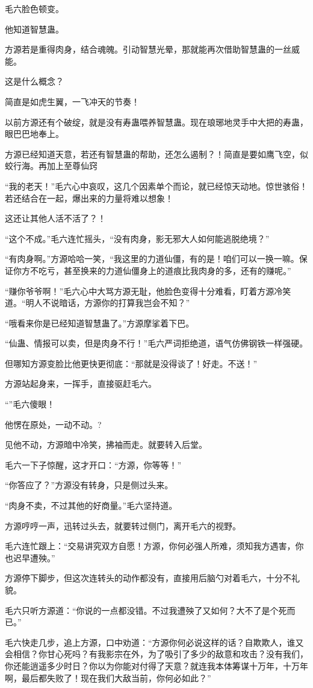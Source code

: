 \begin{this_body}
毛六脸色顿变。

他知道智慧蛊。

方源若是重得肉身，结合魂魄。引动智慧光晕，那就能再次借助智慧蛊的一丝威能。

这是什么概念？

简直是如虎生翼，一飞冲天的节奏！

以前方源还有个破绽，就是没有寿蛊喂养智慧蛊。现在琅琊地灵手中大把的寿蛊，眼巴巴地奉上。

方源已经知道天意，若还有智慧蛊的帮助，还怎么遏制？！简直是要如鹰飞空，似蛟行海。再加上至尊仙窍

“我的老天！”毛六心中哀叹，这几个因素单个而论，就已经惊天动地。惊世骇俗！若还结合在一起，爆出来的力量将难以想象！

这还让其他人活不活了？！

“这个不成。”毛六连忙摇头，“没有肉身，影无邪大人如何能逃脱绝境？”

“有肉身啊。”方源哈哈一笑，“我这里的力道仙僵，有的是！咱们可以一换一嘛。保证你方不吃亏，甚至换来的力道仙僵身上的道痕比我肉身的多，还有的赚呢。”

“赚你爷爷啊！”毛六心中大骂方源无耻，他脸色变得十分难看，盯着方源冷笑道。“明人不说暗话，方源你的打算我岂会不知？”

“哦看来你是已经知道智慧蛊了。”方源摩挲着下巴。

“仙蛊、情报可以卖，但是肉身不行！”毛六严词拒绝道，语气仿佛钢铁一样强硬。

但哪知方源变脸比他更快更彻底：“那就是没得谈了！好走。不送！”

方源站起身来，一挥手，直接驱赶毛六。

“”毛六傻眼！

他愣在原处，一动不动。?

见他不动，方源暗中冷笑，拂袖而走。就要转入后堂。

毛六一下子惊醒，这才开口：“方源，你等等！”

“你答应了？”方源没有转身，只是侧过头来。

“肉身不卖，不过其他的好商量。”毛六坚持道。

方源哼哼一声，迅转过头去，就要转过侧门，离开毛六的视野。

毛六连忙跟上：“交易讲究双方自愿！方源，你何必强人所难，须知我方遇害，你也迟早遭殃。”

方源停下脚步，但这次连转头的动作都没有，直接用后脑勺对着毛六，十分不礼貌。

毛六只听方源道：“你说的一点都没错。不过我遭殃了又如何？大不了是个死而已。”

毛六快走几步，追上方源，口中劝道：“方源你何必说这样的话？自欺欺人，谁又会相信？你甘心死吗？有我影宗在外，为了吸引了多少的敌意和攻击？没有我们，你还能逍遥多少时日？你以为你能对付得了天意？就连我本体筹谋十万年，十万年啊，最后都失败了！现在我们大敌当前，你何必如此？”


\end{this_body}
